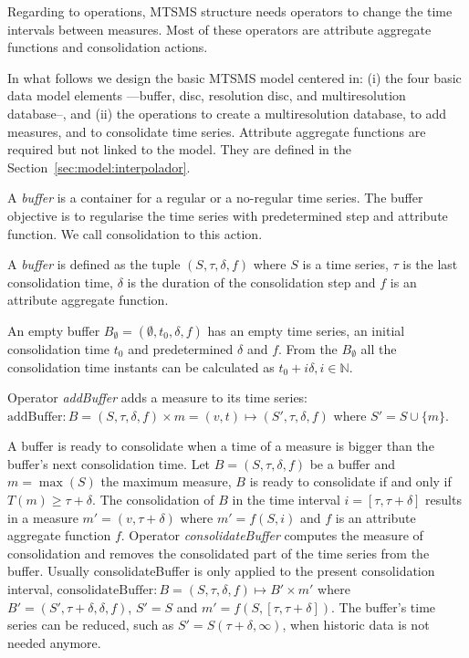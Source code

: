 Regarding to operations, MTSMS structure needs operators to change the
time intervals between measures. Most of these operators are attribute
aggregate functions and consolidation actions. 

In what follows we design the basic MTSMS model centered in: (i) the
four basic data model elements ---buffer, disc, resolution disc, and
multiresolution database--, and (ii) the operations to create a
multiresolution database, to add measures, and to consolidate time
series. Attribute aggregate functions are required but not linked to
the model. They are defined in the
Section~\ref{sec:model:interpolador}.

A \emph{buffer} is a container for a regular or a no-regular time
series. The buffer objective is to regularise the time series with
predetermined step and attribute function. We call consolidation to
this action.
\begin{definition}[Buffer]
  A \emph{buffer} is defined as the tuple $(S,\tau,\delta,f)$ where
  $S$ is a time series, $\tau$ is the last consolidation time,
  $\delta$ is the duration of the consolidation step and $f$ is an
  attribute aggregate function.

  An empty buffer $B_{\emptyset} = (\emptyset,t_0, \delta, f)$ has an
  empty time series, an initial consolidation time $t_0$ and
  predetermined $\delta$ and $f$. From the $B_{\emptyset}$ all the
  consolidation time instants can be calculated as $t_0+i\delta,
  i\in\mathbb{N}$.
\end{definition}

Operator \emph{addBuffer} adds a measure to its time series:
$\text{addBuffer}: B = (S,\tau,\delta,f) \times m = (v,t) \mapsto
(S',\tau,\delta,f)$ where $S' = S \cup \{m\} $.

A buffer is ready to consolidate when a time of a measure is bigger
than the buffer's next consolidation time.  Let $B=(S,\tau,\delta,f)$
be a buffer and $m=\max(S)$ the maximum measure, $B$ is ready to
consolidate if and only if $T(m) \geq \tau+\delta$.  The consolidation
of $B$ in the time interval $i=[\tau,\tau+\delta]$ results in a
measure $m'=(v,\tau+\delta)$ where $m'=f(S,i)$ and $f$ is an attribute
aggregate function $f$. Operator \emph{consolidateBuffer} computes the
measure of consolidation and removes the consolidated part of the time
series from the buffer. Usually consolidateBuffer is only applied to
the present consolidation interval, $\text{consolidateBuffer}:
B=(S,\tau,\delta,f) \mapsto B' \times m' $ where $ B'=
(S',\tau+\delta,\delta,f)$, $S' = S$ and $m' =
f(S,[\tau,\tau+\delta])$. The buffer's time series can be reduced,
such as $ S' = S(\tau+\delta,\infty)$, when historic data is not
needed anymore.

